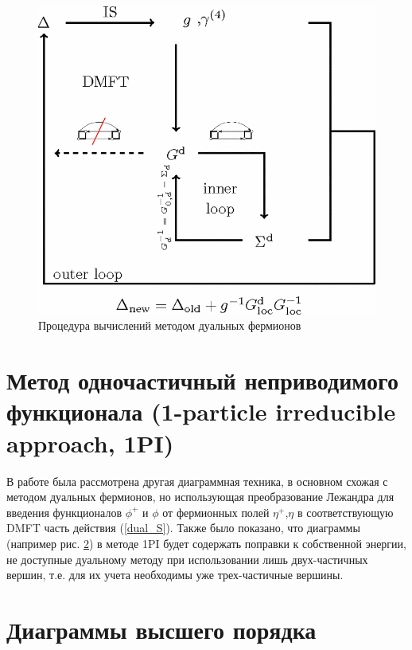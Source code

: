 \documentclass[11pt,a4paper]{report}
\begin{document}
\begin{figure}[H]
\centering
\includegraphics[scale=0.3]{DFcycle}
\caption{Процедура вычислений методом дуальных фермионов}
\label{fig:DFcycle}
\end{figure}

\section{Метод одночастичный неприводимого функционала (1-particle irreducible approach, 1PI)}
В работе \cite{katanin} была рассмотрена другая диаграммная техника, в основном схожая с методом дуальных фермионов, но использующая преобразование Лежандра для введения функционалов $\phi^+$ и $\phi$ от
фермионных полей $\eta^+$,$\eta$ в соответствующую DMFT часть действия (\ref{dual_S}). Также было показано, что диаграммы (например рис. \ref{diag1PI}) в методе 1PI будет содержать поправки к собственной энергии, 
не доступные дуальному методу при использовании лишь двух-частичных вершин, т.е. для их учета необходимы уже трех-частичные вершины.

\begin{figure}[H]
 \centering
 \label{diag1PI}
 \tiny\diagOnePI
\end{figure}

\section{Диаграммы высшего порядка}
\label{section:diags}
\end{document}
